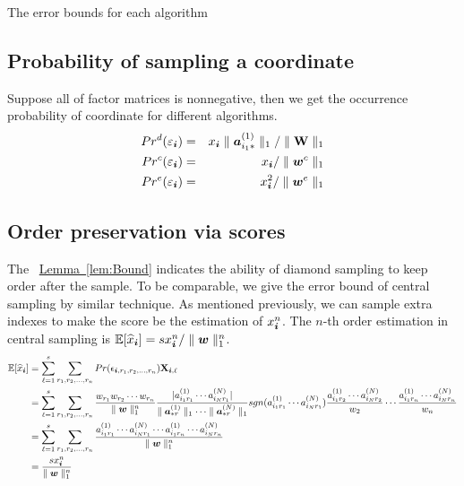 \documentclass{article}
\newcommand{\Sca}[3]{{#1}^{(#2)}_{i_#2#3}}%
\newcommand{\V}[1]{{\bm{{\MakeLowercase{#1}}}}}
\newcommand{\Varow}[1]{\V{a}^{(#1)}_{i_#1*}}
\newcommand{\Vacol}[1]{\V{a}^{(#1)}_{*r}}
\newcommand{\M}[1]{{\bm{\mathbf{\MakeUppercase{#1}}}}}
\newcommand{\norm}[2]{\parallel#1\parallel_{#2}}
\newcommand{\Lem}[1] {\hyperref[lem:#1] {Lemma~\ref*{lem:#1}}} %
\begin{document}
The error bounds for each algorithm

\subsection{Probability of sampling a coordinate}

Suppose all of factor matrices is nonnegative, then we get the occurrence probability of coordinate for different algorithms.
\begin{eqnarray}
    \label{eq:ProbabilityDianomd}
    Pr^d(\varepsilon_{\V{i}}) & = & x_\V{i}\norm{\Varow{1}}{1}/\norm{\M{W}}{1}\\
    \label{eq:ProbabilityCentral}
    Pr^c(\varepsilon_{\V{i}}) & = & x_{\V{i}}/\norm{\V{W}^c}{1}\\
    \label{eq:ProbabilityExtensiom}
    Pr^e(\varepsilon_{\V{i}}) & = & x_{\V{i}}^2/\norm{\V{w}^e}{1}
\end{eqnarray}

\subsection{Order preservation via scores}

The ~\Lem{Bound} indicates the ability of diamond sampling to keep order after the sample. To be comparable, we give the error bound of central sampling by similar technique.
As mentioned previously, we can sample extra indexes to make the score be the estimation of $x^n_{\V{i}}$. The $n$-th order estimation in central sampling is $\mathbb{E}[\widehat{x}_{\V{i}}]= sx^n_{\V{i}}/\norm{\V{w}}{1}^n$.
\begin{align*}
\mathbb{E}[\widehat{x}_{\V{i}}]& =\sum_{\ell=1}^{s}\sum_{r_1,r_2,...,r_n} Pr(\epsilon_{\V{i},r_1,r_2,...,r_n})\M{X}_{\V{i},\ell}\\
& = \sum_{\ell=1}^{s}\sum_{r_1,r_2,...,r_n}
\frac{w_{r_1}w_{r_2}\cdots w_{r_n}}{\norm{\V{W}}{1}^n}
\frac{|\Sca{a}{1}{r_1}\cdots\Sca{a}{N}{r_1}|}{\norm{\Vacol{1}}{1}\cdots\norm{\Vacol{N}}{1}}
sgn(\Sca{a}{1}{r_1}\cdots\Sca{a}{N}{r_1})\frac{\Sca{a}{1}{r_2}\cdots\Sca{a}{N}{r_2}}{w_2}\cdots\frac{\Sca{a}{1}{r_n}\cdots\Sca{a}{N}{r_n}}{w_n}
\\
& = \sum_{\ell=1}^{s}\sum_{r_1,r_2,...,r_n} \frac{\Sca{a}{1}{r_1}\cdots\Sca{a}{N}{r_1}\cdots\Sca{a}{1}{r_n}\cdots\Sca{a}{N}{r_n}}{\norm{\V{W}}{1}^n}\\
& = \frac{sx^n_{\V{i}}}{\norm{\V{w}}{1}^n}
\end{align*}
\end{document}
